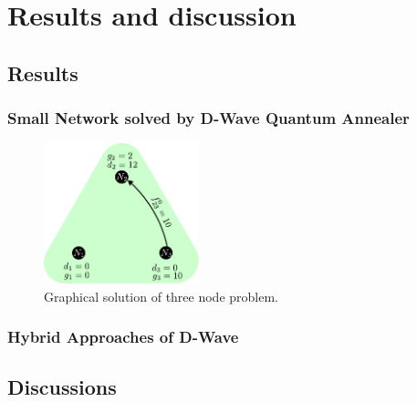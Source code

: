 
\chapter{Results and discussion} %

\label{Chapter5} %
\section{Results}
\subsection{Small Network solved by D-Wave Quantum Annealer}
\begin{figure}[H]
  \begin{center}
\includegraphics[width=0.4\textwidth]{Figures/Green_Final.pdf}
  \end{center}
  \caption{Graphical solution of three node problem.}
  \label{fig: Green_final}
\end{figure}
\subsection{Hybrid Approaches of D-Wave}
\section{Discussions}
